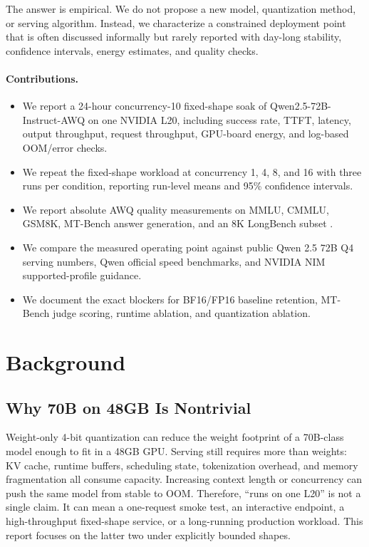 \documentclass[11pt]{article}
\newcommand{\qwenawq}{Qwen2.5\nobreakdash-72B\nobreakdash-Instruct\nobreakdash-AWQ}
\begin{document}
The answer is empirical. We do not propose a new model, quantization method, or
serving algorithm. Instead, we characterize a constrained deployment point that
is often discussed informally but rarely reported with day-long stability,
confidence intervals, energy estimates, and quality checks.

\paragraph{Contributions.}

\begin{itemize}
  \item We report a 24-hour concurrency-10 fixed-shape soak of
        \qwenawq{} on one NVIDIA L20, including success rate,
        TTFT, latency, output throughput, request throughput, GPU-board energy,
        and log-based OOM/error checks.
  \item We repeat the fixed-shape workload at concurrency 1, 4, 8, and 16 with
        three runs per condition, reporting run-level means and 95\% confidence
        intervals.
  \item We report absolute AWQ quality measurements on MMLU, CMMLU, GSM8K,
        MT-Bench answer generation, and an 8K LongBench subset
        \cite{mt_bench_arena,longbench}.
  \item We compare the measured operating point against public Qwen 2.5 72B Q4
        serving numbers, Qwen official speed benchmarks, and NVIDIA NIM
        supported-profile guidance.
  \item We document the exact blockers for BF16/FP16 baseline retention,
        MT-Bench judge scoring, runtime ablation, and quantization ablation.
\end{itemize}

\section{Background}

\subsection{Why 70B on 48GB Is Nontrivial}

Weight-only 4-bit quantization can reduce the weight footprint of a 70B-class
model enough to fit in a 48GB GPU. Serving still requires more than weights:
KV cache, runtime buffers, scheduling state, tokenization overhead, and memory
fragmentation all consume capacity. Increasing context length or concurrency can
push the same model from stable to OOM. Therefore, ``runs on one L20'' is not a
single claim. It can mean a one-request smoke test, an interactive endpoint, a
high-throughput fixed-shape service, or a long-running production workload. This
report focuses on the latter two under explicitly bounded shapes.
\end{document}
